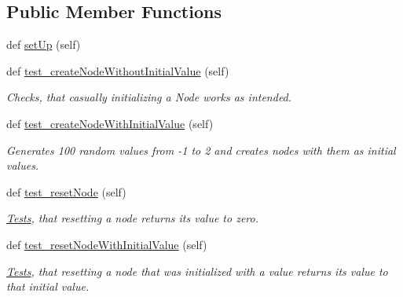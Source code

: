 \subsection*{Public Member Functions}
\begin{DoxyCompactItemize}
\item 
def \hyperlink{classNEAT__PyGenetics_1_1NEAT_1_1Tests_1_1SimulationGenomeTests_1_1test__simulationNodes_1_1TestSimulationNode_a4f0dea64069a60e1044bea518e71eb2a}{set\+Up} (self)
\item 
def \hyperlink{classNEAT__PyGenetics_1_1NEAT_1_1Tests_1_1SimulationGenomeTests_1_1test__simulationNodes_1_1TestSimulationNode_a8e78e199d86083cfb7e2b24f8d749f53}{test\+\_\+create\+Node\+Without\+Initial\+Value} (self)
\begin{DoxyCompactList}\small\item\em Checks, that casually initializing a Node works as intended. \end{DoxyCompactList}\item 
def \hyperlink{classNEAT__PyGenetics_1_1NEAT_1_1Tests_1_1SimulationGenomeTests_1_1test__simulationNodes_1_1TestSimulationNode_a946f16257d774eb20ebbc39ffbba80fe}{test\+\_\+create\+Node\+With\+Initial\+Value} (self)
\begin{DoxyCompactList}\small\item\em Generates 100 random values from -\/1 to 2 and creates nodes with them as initial values. \end{DoxyCompactList}\item 
def \hyperlink{classNEAT__PyGenetics_1_1NEAT_1_1Tests_1_1SimulationGenomeTests_1_1test__simulationNodes_1_1TestSimulationNode_a2204237f3ad2e72d386f5c58a6a66718}{test\+\_\+reset\+Node} (self)
\begin{DoxyCompactList}\small\item\em \hyperlink{namespaceNEAT__PyGenetics_1_1NEAT_1_1Tests}{Tests}, that resetting a node returns its value to zero. \end{DoxyCompactList}\item 
def \hyperlink{classNEAT__PyGenetics_1_1NEAT_1_1Tests_1_1SimulationGenomeTests_1_1test__simulationNodes_1_1TestSimulationNode_a83849a9e57a26f12bd9512d726169155}{test\+\_\+reset\+Node\+With\+Initial\+Value} (self)
\begin{DoxyCompactList}\small\item\em \hyperlink{namespaceNEAT__PyGenetics_1_1NEAT_1_1Tests}{Tests}, that resetting a node that was initialized with a value returns its value to that initial value. \end{DoxyCompactList}\item 

\end{DoxyCompactItemize}
